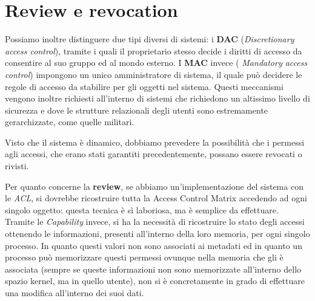 \section{Review e revocation}
Possiamo inoltre distinguere due tipi diversi di sistemi: i \textbf{DAC} (\textit{Discretionary
access control}), tramite i quali il proprietario stesso decide i diritti di 
accesso da consentire al suo gruppo ed al mondo esterno. I \textbf{MAC} invece (\textit{
Mandatory access control}) impongono un unico amministratore di sistema, il
quale può decidere le regole di accesso da stabilire per gli oggetti nel 
sistema. Questi meccanismi vengono inoltre richiesti all'interno di sistemi
che richiedono un altissimo livello di sicurezza e dove le strutture relazionali
degli utenti sono estremamente gerarchizzate, come quelle militari.

Visto che il sistema è dinamico, dobbiamo prevedere la possibilità che i permessi
agli accessi, che erano stati garantiti precedentemente, possano essere revocati
o rivisti. 

Per quanto concerne la \textbf{review}, se abbiamo un'implementazione del sistema
con le \textit{ACL}, si dovrebbe ricostruire tutta la Access Control Matrix accedendo
ad ogni singolo oggetto: questa tecnica è sì laboriosa, ma è semplice da effettuare.
Tramite le \textit{Capability} invece, si ha la necessità di ricostruire lo stato
degli accessi ottenendo le informazioni, presenti all'interno della
loro memoria, per ogni singolo processo. In quanto questi valori non sono 
associati ai metadati ed in quanto un processo può memorizzare questi
permessi ovunque nella memoria che gli è associata (sempre se queste informazioni
non sono memorizzate all'interno dello spazio kernel, ma in quello utente), non 
si è concretamente in grado di effettuare una modifica all'interno dei suoi dati.



